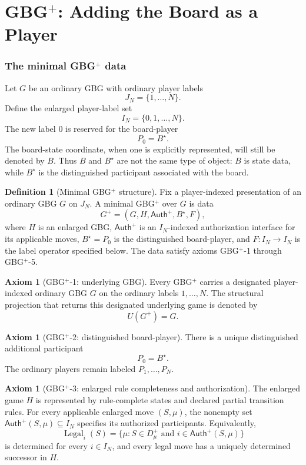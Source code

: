 \documentclass[11pt]{article}
\theoremstyle{definition}
\newtheorem{definition}[theorem]{Definition}
\newtheorem{axiom}[theorem]{Axiom}
\theoremstyle{remark}
\newcommand{\Legal}{\operatorname{Legal}}
\newcommand{\Board}{B^{\star}}
\begin{document}
\part{\texorpdfstring{GBG$^{+}$}{GBG+}: Adding the Board as a Player}

\section{The minimal \texorpdfstring{GBG$^{+}$}{GBG+} data}

Let $G$ be an ordinary GBG with ordinary player labels
\[
J_N=\{1,\ldots,N\}.
\]
Define the enlarged player-label set
\[
I_N=\{0,1,\ldots,N\}.
\]
The new label $0$ is reserved for the board-player
\[
P_0=\Board.
\]
The board-state coordinate, when one is explicitly represented, will still be denoted by $B$.  Thus $B$ and $\Board$ are not the same type of object: $B$ is state data, while $\Board$ is the distinguished participant associated with the board.

\begin{definition}[Minimal GBG$^{+}$ structure]
Fix a player-indexed presentation of an ordinary GBG $G$ on $J_N$.  A minimal GBG$^{+}$ over $G$ is data
\[
G^{+}=(G,H,\mathsf{Auth}^{+},\Board,F),
\]
where $H$ is an enlarged GBG, $\mathsf{Auth}^{+}$ is an $I_N$-indexed authorization interface for its applicable moves, $\Board=P_0$ is the distinguished board-player, and $F:I_N\to I_N$ is the label operator specified below.  The data satisfy axioms GBG$^{+}$-1 through GBG$^{+}$-5.
\end{definition}

\begin{axiom}[GBG$^{+}$-1: underlying GBG]
Every GBG$^{+}$ carries a designated player-indexed ordinary GBG $G$ on the ordinary labels $1,\ldots,N$.  The structural projection that returns this designated underlying game is denoted by
\[
U(G^{+})=G.
\]
\end{axiom}

\begin{axiom}[GBG$^{+}$-2: distinguished board-player]
There is a unique distinguished additional participant
\[
P_0=\Board.
\]
The ordinary players remain labeled $P_1,\ldots,P_N$.
\end{axiom}

\begin{axiom}[GBG$^{+}$-3: enlarged rule completeness and authorization]
The enlarged game $H$ is represented by rule-complete states and declared partial transition rules.  For every applicable enlarged move $(S,\mu)$, the nonempty set $\mathsf{Auth}^{+}(S,\mu)\subseteq I_N$ specifies its authorized participants.  Equivalently,
\[
\Legal_i(S)=\{\mu:S\in D_\mu^{+}\text{ and }i\in\mathsf{Auth}^{+}(S,\mu)\}
\]
is determined for every $i\in I_N$, and every legal move has a uniquely determined successor in $H$.
\end{axiom}
\end{document}
